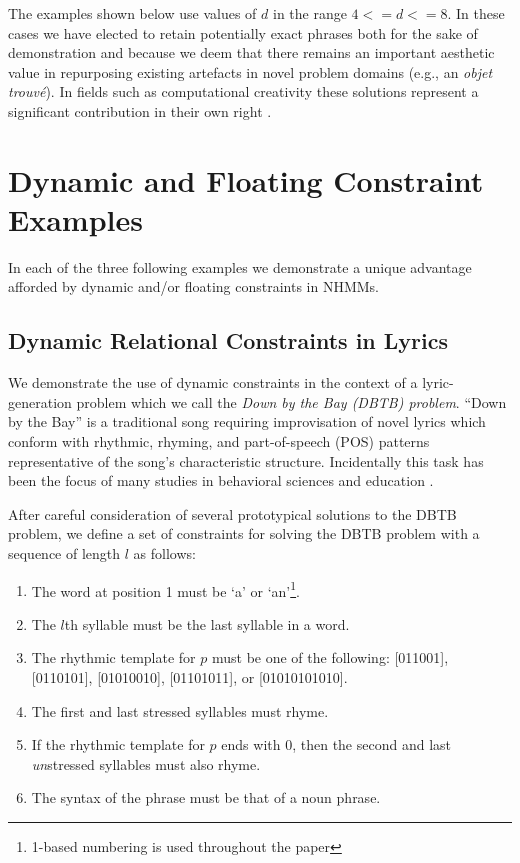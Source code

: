 \documentclass[phd,electronic,oneside,twosidetoc,letterpaper,chaptercenter,parttop,lol,lof,lot]{byumsphd}
\begin{document}
The examples shown below use values of $d$ in the range $4 <= d <= 8$. In these cases we have elected to retain potentially exact phrases both for the sake of demonstration and because we deem that there remains an important aesthetic value in repurposing existing artefacts in novel problem domains (e.g., an \textit{objet trouv\'{e}}). In fields such as computational creativity these solutions represent a significant contribution in their own right \cite{ColtonExperimentsBrowsing}.

\section{Dynamic and Floating Constraint Examples}

In each of the three following examples we demonstrate a unique advantage afforded by dynamic and/or floating constraints in NHMMs. 

\subsection{Dynamic Relational Constraints in Lyrics}

We demonstrate the use of dynamic constraints in the context of a lyric-generation problem which we call the \textit{Down by the Bay (DBTB) problem}. ``Down by the Bay'' is a traditional song requiring improvisation of novel lyrics which conform with rhythmic, rhyming, and part-of-speech (POS) patterns representative of the song's characteristic structure. Incidentally this task has been the focus of many studies in behavioral sciences and education \cite{jalongo1997using,pasiali2004use,robb2008randomized,towell1999motivating,kolb1996read}.

After careful consideration of several prototypical solutions to the DBTB problem, we define a set of constraints for solving the DBTB problem with a sequence of length $l$ as follows:

\begin{enumerate}
\item The word at position 1 must be `a' or `an'\footnote{1-based numbering is used throughout the paper}.
\item The $l$th syllable must be the last syllable in a word.
\item The rhythmic template for $p$ must be one of the following: [011001], [0110101], [01010010], [01101011], or [01010101010].
\item \label{mandatory_rhyme_constraint}The first and last stressed syllables must rhyme.
\item \label{optional_rhyme_constraint}If the rhythmic template for $p$ ends with $0$, then the second and last \textit{un}stressed syllables must also rhyme.
\item \label{POS_floating_constraint}The syntax of the phrase must be that of a noun phrase.
\end{enumerate}
\end{document}
